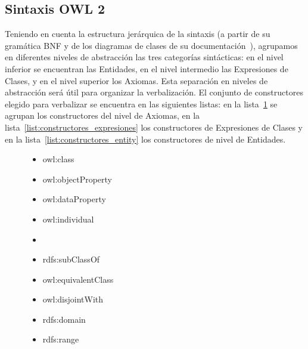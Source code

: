 \subsection{Sintaxis OWL 2}
\label{sec:gen_doc_sintaxis_owl}
Teniendo en cuenta la estructura jerárquica de la sintaxis (a partir de su gramática BNF y de los diagramas de clases de su documentación~\cite{OWL2W3C}), agrupamos en diferentes niveles de abstracción las tres categorías sintácticas: en el nivel inferior se encuentran las Entidades, en el nivel intermedio las Expresiones de Clases, y en el nivel superior los Axiomas. Esta separación en niveles de abstracción será útil para organizar la verbalización. El conjunto de constructores elegido para verbalizar se encuentra en las siguientes listas: en la lista~\ref{list:constructores_axiomas} se agrupan los constructores del nivel de Axiomas, en la lista~\ref{list:constructores_expresiones} los constructores de Expresiones de Clases y en la lista~\ref{list:constructores_entity} los constructores de nivel de Entidades.
\begin{figure}
\begin{multicols}{2}
\label{list:constructores_entity}
    \begin{itemize}
        \item owl:class
        \item owl:objectProperty
        \item owl:dataProperty
        \item owl:individual
        \item[\vspace{\fill}]
    \end{itemize}

\label{list:constructores_axiomas}
    \begin{itemize}
        \item rdfs:subClassOf
        \item owl:equivalentClass
        \item owl:disjointWith
        \item rdfs:domain
        \item rdfs:range
    \end{itemize}
    \end{multicols}
\end{figure}


